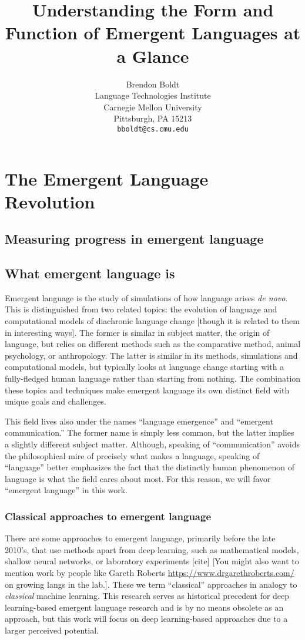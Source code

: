 \documentclass[letterpaper]{report}
\title{Understanding the Form and Function of Emergent Languages at a Glance}
\author{%
  Brendon Boldt\\
  Language Technologies Institute\\
  Carnegie Mellon University\\
  Pittsburgh, PA 15213 \\
  \texttt{bboldt@cs.cmu.edu} \\
}
\newcommand\cmg[1]{{\color{gray}[#1]}}
\newcommand\drm[1]{{\color{red}[#1]}}
\begin{document}
\maketitle

\setcounter{tocdepth}{1}
\tableofcontents



\chapter{The Emergent Language Revolution}
\section{Measuring progress in emergent language}
\section{What emergent language is}
Emergent language is the study of simulations of how language arises \emph{de novo}.
This is distinguished from two related topics: the evolution of language and computational models of diachronic language change \drm{though it is related to them in interesting ways}.
The former is similar in subject matter, the origin of language, but relies on different methods such as the comparative method, animal psychology, or anthropology.
The latter is similar in its methods, simulations and computational models, but typically looks at language change starting with a fully-fledged human language rather than starting from nothing.
The combination these topics and techniques make emergent language its own distinct field with unique goals and challenges.

This field lives also under the names ``language emergence'' and ``emergent communication.''
The former name is simply less common, but the latter implies a slightly different subject matter.
Although, speaking of ``communication'' avoids the philosophical mire of precisely what makes a language, speaking of ``language'' better emphasizes the fact that the distinctly human phenomenon of language is what the field cares about most.
For this reason, we will favor ``emergent language'' in this work.

\subsection{Classical approaches to emergent language}
There are some approaches to emergent language, primarily before the late 2010's, that use methods apart from deep learning, such as mathematical models, shallow neural networks, or laboratory experiments \cmg{cite} \drm{You might also want to mention work by people like Gareth Roberts \url{https://www.drgarethroberts.com/} on growing langs in the lab.}.
These we term ``classical'' approaches in analogy to \emph{classical} machine learning.
This research serves as historical precedent for deep learning-based emergent language research and is by no means obsolete as an approach, but this work will focus on deep learning-based approaches due to a larger perceived potential.
\end{document}
